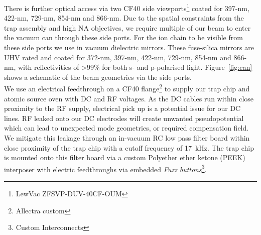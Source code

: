     There is further optical access via
    two CF40 side viewports\footnote{LewVac ZFSVP-DUV-40CF-OUM} coated
    for 397-nm, 422-nm, 729-nm, 854-nm and 866-nm.  Due to the spatial
    constraints from the trap assembly and high NA objectives, we require
    multiple of our beam to enter the vacuum can through these side ports. For the ion chain to be visible from these side ports we use in vacuum dielectric
    mirrors. These fuse-silica mirrors are UHV rated and coated for 372-nm, 397-nm,
    422-nm, 729-nm, 854-nm and 866-nm, with reflectivities of >99\% for both s-
    and p-polarised light. Figure~\ref{fig:can} shows a schematic of the beam
    geometries via the side ports.\\
    We use an electrical feedthrough on a CF40 flange\footnote{Allectra custom}
    to supply our trap chip and atomic source oven with DC and RF voltages. As
    the DC cables run within close proximity to the RF supply, electrical pick
    up is a potential issue for our DC lines. RF leaked onto our DC electrodes
    will create unwanted pseudopotential which can lead to unexpected mode
    geometries, or required compensation field. We mitigate this leakage through
    an in-vacuum RC low pass filter board within close proximity of the trap
    chip with a cutoff frequency of 17~kHz. The trap chip is mounted onto this filter board via a custom Polyether ether ketone (PEEK) interposer with electric feedthroughs via embedded \emph{Fuzz buttons}\footnote{Custom Interconnects}. \\


